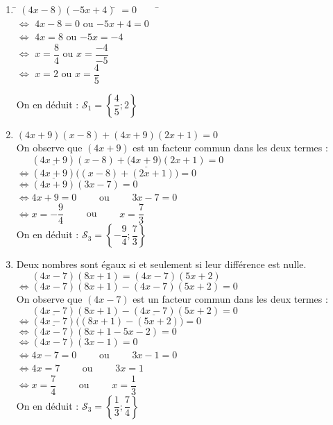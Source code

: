 \documentclass[a4paper,11pt,exos]{nsi} %
\begin{document}
\begin{enumerate}
    \item \begin{tabbing}
        \qquad\qquad  \=  $(4x-8)(-5x+4)$\= $=0\qquad$  \= $\qquad$  \\
        $\iff$  \>  $4x-8=0$    \>  ou  \>$-5x+4=0$\\
        $\iff$  \>  $4x=8$      \>  ou  \>$ -5x=-4$\\
        $\iff$  \>  $x=\dfrac{8}{4}$ \>   ou  \>$ x=\dfrac{-4}{-5}$\\
        $\iff$  \>  $x=2$       \>  ou  \>  $x=\dfrac{4}{5}$
    \end{tabbing}
    On en déduit :  $\mathcal{S}_1=\left\{\dfrac{4}{5};2\right\}$

    \item  $(4x+9)( x-8)+(4x+9)(2x+1)=0$\\ On observe que $(4x+9)$ est un facteur commun dans les deux termes :\\ $\phantom{\iff} (\underline{4x+9})( x-8)+(\underline{4x+9)}( 2x+1)=0$\\ $\iff (\underline{4x+9})\Big(( x-8)+(2x+1)\Big)=0$\\ $\iff (4x+9)( 3x-7)=0$\\
    $\iff 4x+9=0\qquad$ ou  $\qquad 3x-7=0$\\$\iff x=-\dfrac{9}{4}\qquad$ ou $\qquad x=\dfrac{7}{3}$\\
                       On en déduit :  $\mathcal{S}_3=\left\{-\dfrac{9}{4};\dfrac{7}{3}\right\}$
    
    \item Deux nombres sont égaux si et seulement si leur différence est nulle.\\
    $\phantom{\iff}(4x-7)(8x+1)=(4x-7)(5x+2)$\\
    $\iff (4x-7)(8x+1)-(4x-7)(5x+2)=0$\\ 
    On observe que $(4x-7)$ est un facteur commun dans les deux termes :\\
    $\phantom{\iff}(\underline{4x-7})(8x+1)-(\underline{4x-7})(5x+2)=0$\\
    $\iff (\underline{4x-7})\Big((8x+1)-(5x+2)\Big)=0$\\
    $\iff (4x-7)(8x+1-5x-2)=0$\\
    $\iff (4x-7)(3x-1)=0$\\
    $\iff 4x-7=0\qquad$ ou $\qquad3x-1=0$\\
    $\iff 4x=7\qquad$ ou $\qquad 3x=1$\\
    $\iff x=\dfrac{7}{4}\qquad$ ou $\qquad x=\dfrac{1}{3}$\\
    On en déduit :  $\mathcal{S}_3=\left\{\dfrac{1}{3};\dfrac{7}{4}\right\}$
\end{enumerate}    
\end{document}
